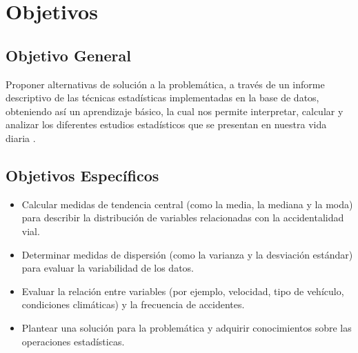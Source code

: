 \section*{Objetivos}
\subsection*{Objetivo General}
Proponer alternativas de solución a la problemática, a través de un informe descriptivo de las técnicas estadísticas implementadas en la base de datos, obteniendo así un aprendizaje básico, la cual nos permite interpretar, calcular y analizar los diferentes estudios estadísticos que se presentan en nuestra vida diaria .
\subsection*{Objetivos Específicos}
	\begin{itemize}
		\item Calcular medidas de tendencia central (como la media, la mediana y la moda) para describir la distribución de variables relacionadas con la accidentalidad vial.
		\item Determinar medidas de dispersión (como la varianza y la desviación estándar) para evaluar la variabilidad de los datos.
		\item Evaluar la relación entre variables (por ejemplo, velocidad, tipo de vehículo, condiciones climáticas) y la frecuencia de accidentes.
		\item Plantear una solución para la problemática y adquirir conocimientos sobre las operaciones estadísticas.
	\end{itemize}
\newpage
